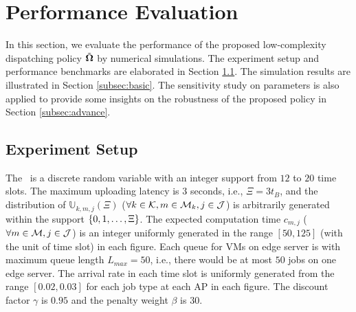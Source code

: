 \section{Performance Evaluation}
\label{sec:evaluation}
In this section, we evaluate the performance of the proposed low-complexity dispatching policy $\tilde{\boldsymbol{\Omega}}$ by numerical simulations.
The experiment setup and performance benchmarks are elaborated in Section \ref{subsec:setup}.
The simulation results are illustrated in Section \ref{subsec:basic}.
The sensitivity study on parameters is also applied to provide some insights on the robustness of the proposed policy in Section \ref{subsec:advance}.

\subsection{Experiment Setup}
\label{subsec:setup}

The \brlatency~is a discrete random variable with an integer support from $12$ to $20$ time slots.
The maximum uploading latency is $3$ seconds, i.e., $\Xi = 3t_B$, and the distribution of $\mathbb{U}_{k,m,j}(\Xi)$ ($\forall k\in\mathcal{K}, m\in\mathcal{M}_{k}, j\in\mathcal{J}$) is arbitrarily generated within the support $\{0, 1, \dots, \Xi\}$.
The expected computation time $c_{m,j}$ ($\forall m\in\mathcal{M}, j\in\mathcal{J}$) is an integer uniformly generated in the range $[50,125]$ (with the unit of time slot) in each figure.
Each queue for VMs on edge server is with maximum queue length $L_{max}=50$, i.e., there would be at most $50$ jobs on one edge server.
The arrival rate in each time slot is uniformly generated from the range $[0.02, 0.03]$ for each job type at each AP in each figure.
The discount factor $\gamma$ is $0.95$ and the penalty weight $\beta$ is $30$.
        
